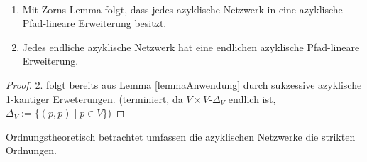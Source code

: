 \begin{theorem}\
	\begin{enumerate}
		\item Mit Zorns Lemma folgt, dass jedes azyklische Netzwerk in eine azyklische Pfad-lineare Erweiterung besitzt.
		\item Jedes endliche azyklische Netzwerk hat eine endlichen azyklische Pfad-lineare Erweiterung.
	\end{enumerate}
\end{theorem}

\begin{proof}
	2. folgt bereits aus Lemma \ref{lemmaAnwendung} durch sukzessive azyklische 1-kantiger Erweterungen. (terminiert, da $V\times V$-$\Delta_V$ endlich ist, $\Delta_V:=\big\lbrace(p,p)\mid p\in V\big\rbrace$)
\end{proof}

\begin{bemerkung}
	Ordnungstheoretisch betrachtet umfassen die azyklischen Netzwerke die strikten Ordnungen.
\end{bemerkung}


